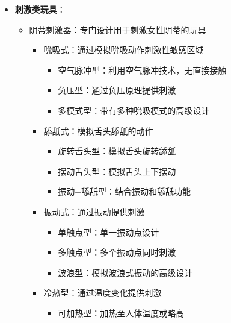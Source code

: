 \documentclass[12pt,UTF8]{ctexbook}
\begin{document}
\begin{itemize}
\begin{itemize}
		\begin{itemize}
			\item 经典弯曲型：传统的弯曲设计，针对前列腺位置
			\item 遥控型：可通过遥控器或手机APP控制
			\begin{itemize}
				\item 近距离遥控：普通遥控器控制
				\item 远程遥控：通过手机APP远程控制，适合异地恋
			\end{itemize}
			\item 振动+旋转型：结合振动和旋转功能的高级设计
			\item 穿戴型：可长时间穿戴的前列腺按摩器
		\end{itemize}
	\end{itemize}
	\item \textbf{刺激类玩具}：
	\begin{itemize}
		\item 阴蒂刺激器：专门设计用于刺激女性阴蒂的玩具
		\begin{itemize}
			\item 吮吸式：通过模拟吮吸动作刺激性敏感区域
			\begin{itemize}
				\item 空气脉冲型：利用空气脉冲技术，无直接接触
				\item 负压型：通过负压原理提供刺激
				\item 多模式型：带有多种吮吸模式的高级设计
			\end{itemize}
			\item 舔舐式：模拟舌头舔舐的动作
			\begin{itemize}
				\item 旋转舌头型：模拟舌头旋转舔舐
				\item 摆动舌头型：模拟舌头上下摆动
				\item 振动+舔舐型：结合振动和舔舐功能
			\end{itemize}
			\item 振动式：通过振动提供刺激
			\begin{itemize}
				\item 单触点型：单一振动点设计
				\item 多触点型：多个振动点同时刺激
				\item 波浪型：模拟波浪式振动的高级设计
			\end{itemize}
			\item 冷热型：通过温度变化提供刺激
			\begin{itemize}
				\item 可加热型：加热至人体温度或略高

\end{itemize}
\end{itemize}
\end{itemize}
\end{itemize}
\end{document}
